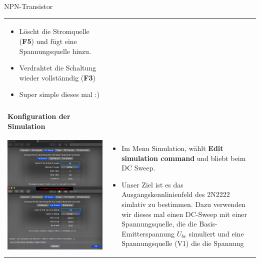 \begin{frame}[t]{NPN-Transistor}
\begin{spacing}{0.9}
\begin{tiny}
\begin{table}[h!]
\begin{tabular}{p{3cm} p{7cm}}
\begin{minipage}{.7\textwidth}
\begin{itemize}
            \item Löscht die Stromquelle (\textbf{F5}) und fügt eine Spannungsquelle hinzu. 
            \item Verdrahtet die Schaltung wieder vollstänndig (\textbf{F3})
            \item Super simple dieses mal :)
          \end{itemize}
          \end{minipage} 
          \\
           & \\
           \hline
           \textbf{Konfiguration der Simulation} & \\
           \hline \\
           \begin{minipage}{.3\textwidth}
            \includegraphics[width=0.8\linewidth]{pictures/simulationcmd_4.png}
          \end{minipage} 
          & 
          \begin{minipage}{.7\textwidth}
          \begin{itemize}
            \item Im Menu Simulation, wählt \textbf{Edit simulation command} und bliebt beim DC Sweep. 
            \item Unser Ziel ist es das Ausgangskennlinienfeld des 2N2222 simlativ zu bestimmen. Dazu verwenden wir dieses mal
            einen DC-Sweep mit einer Spannungsquelle, die die Basis-Emitterspannung $U_{be}$ simuliert und eine Spannungsquelle (V1) die die Spannung

\end{itemize}
\end{minipage}
\end{tabular}
\end{table}
\end{tiny}
\end{spacing}
\end{frame}
